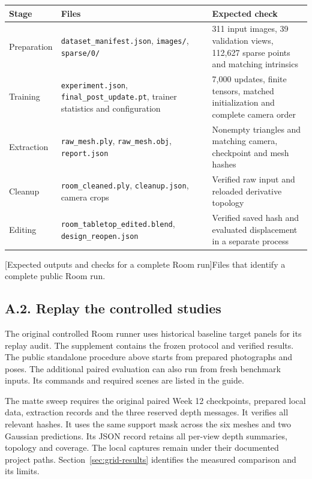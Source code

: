 \begin{center}\begin{minipage}{\linewidth}
\small\begin{tabularx}{\linewidth}{@{}p{.17\linewidth}YY@{}}
\toprule
Stage & Files & Expected check\\
\midrule
Preparation & \texttt{dataset\_manifest.json}, \texttt{images/}, \texttt{sparse/0/} & 311 input images, 39 validation views, 112,627 sparse points and matching intrinsics\\
Training & \texttt{experiment.json}, \texttt{final\_post\_update.pt}, trainer statistics and configuration & 7,000 updates, finite tensors, matched initialization and complete camera order\\
Extraction & \texttt{raw\_mesh.ply}, \texttt{raw\_mesh.obj}, \texttt{report.json} & Nonempty triangles and matching camera, checkpoint and mesh hashes\\
Cleanup & \texttt{room\_cleaned.ply}, \texttt{cleanup.json}, camera crops & Verified raw input and reloaded derivative topology\\
Editing & \texttt{room\_tabletop\_edited.blend}, \texttt{design\_reopen.json} & Verified saved hash and evaluated displacement in a separate process\\
\bottomrule
\end{tabularx}\par
{}[Expected outputs and checks for a complete Room run]{Files that identify a complete public Room run.}\label{tab:replay-artifacts}
\end{minipage}\end{center}

\clearpage


\subsection*{A.2. Replay the controlled studies}
The original controlled Room runner uses historical baseline target panels for its replay audit. The supplement contains the frozen protocol and verified results. The public standalone procedure above starts from prepared photographs and poses. The additional paired evaluation can also run from fresh benchmark inputs. Its commands and required scenes are listed in the guide.

The matte sweep requires the original paired Week 12 checkpoints, prepared local data, extraction records and the three reserved depth messages. It verifies all relevant hashes. It uses the same support mask across the six meshes and two Gaussian predictions. Its JSON record retains all per-view depth summaries, topology and coverage. The local captures remain under their documented project paths. Section~\ref{sec:grid-results} identifies the measured comparison and its limits.

